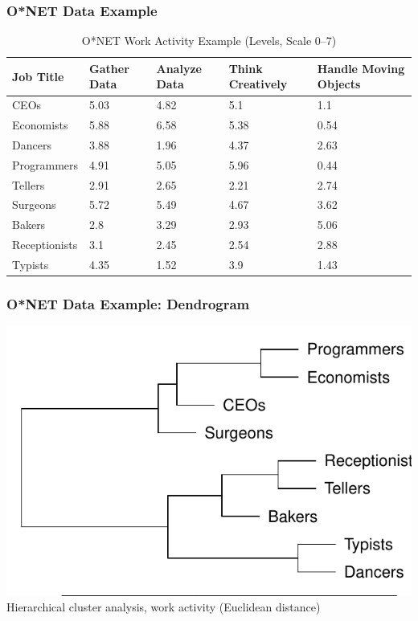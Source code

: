 \documentclass[red]{beamer}
\begin{document}
\begin{frame}
\frametitle{O*NET Data Example}
\begin{table}[htbp]
\begin{tabular}{|p{2cm}|p{1.65cm}|p{1.5cm}|p{1.5cm}|p{1.5cm}|}
\hline
{Job Title} & {Gather Data} & {Analyze Data} & {\small Think Creatively} & {Handle Moving Objects} \\ \hline
{CEOs} & 5.03 & 4.82 & 5.1 & 1.1  \\ \hline
{Economists} & 5.88 & 6.58 & 5.38 & 0.54 \\ \hline
{Dancers} & 3.88 & 1.96 & 4.37 & 2.63 \\ \hline
{Programmers} & 4.91 & 5.05 & 5.96 & 0.44 \\ \hline
{Tellers} & 2.91 & 2.65 & 2.21 & 2.74 \\ \hline
{Surgeons} & 5.72 & 5.49 & 4.67 & 3.62 \\ \hline
{Bakers} & 2.8 & 3.29 & 2.93 & 5.06 \\ \hline
{Receptionists} & 3.1 & 2.45 & 2.54 & 2.88 \\ \hline
{Typists} & 4.35 & 1.52 & 3.9 & 1.43 \\ \hline
\end{tabular}
\caption{O*NET Work Activity Example (Levels, Scale 0--7)}
\label{onetex}
\end{table}
\end{frame}

\begin{frame}
  \frametitle{O*NET Data Example: Dendrogram}
  \begin{center}
  \includegraphics[width=\textwidth]{slides_fig/example_cluster.pdf} \\
  Hierarchical cluster analysis, work activity (Euclidean distance)
  \end{center}
\end{frame}
\end{document}
